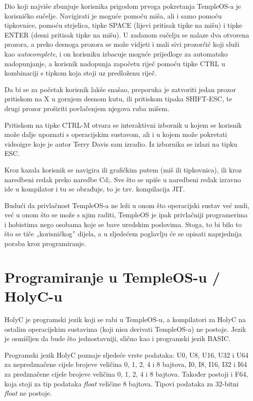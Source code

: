 \documentclass{foi}
\begin{document}
Dio koji najviše zbunjuje korisnika prigodom prvoga pokretanja TempleOS-a je korisničko sučelje. Navigirati je moguće pomoću miša, ali i samo pomoću tipkovnice, pomoću strjelica, tipke {\selectfont SPACE} (lijevi pritisak tipke na mišu) i tipke {\selectfont ENTER} (desni pritisak tipke na mišu). U zadanom sučelju se nalaze dva otvorena prozora, a preko desnoga prozora se može vidjeti i mali sivi prozorčić koji služi kao \emph{autocomplete}, i on korisniku izbacuje moguće prijedloge za automatsko nadopunjanje, a korisnik nadopunja započetu riječ pomoću tipke {\selectfont CTRL} u kombinaciji s tipkom koja stoji uz predloženu riječ.

Da bi se za početak korisnik lakše snašao, preporuka je zatvoriti jedan prozor pritiskom na {\selectfont X} u gornjem desnom kutu, ili pritiskom tipaka {\selectfont SHIFT-ESC}, te drugi prozor proširiti povlačenjem njegova ruba mišem.

Pritiskom na tipke {\selectfont CTRL-M} otvara se interaktivni izbornik u kojem se korisnik može dalje upoznati s operacijskim sustavom, ali i u kojem može pokretati videoigre koje je autor Terry Davis sam izradio. Iz izbornika se izlazi na tipku {\selectfont ESC}.

Kroz kazala korisnik se navigira ili grafičkim putem (miš ili tipkovnica), ili kroz naredbeni redak preko naredbe {\selectfont Cd;}. Sve što se upiše u naredbeni redak izravno ide u kompilator i tu se obrađuje, to je tzv. kompilacija JIT.

Budući da privlačnost TempleOS-a ne leži u onom što operacijski sustav već nudi, već u onom što se može s njim raditi, TempleOS je ipak privlačniji programerima i hobistima nego osobama koje se bave uredskim poslovima. Stoga, to bi bilo to što se tiče „korisničkog” dijela, a u sljedećem poglavlju će se opisati naprjednija poraba kroz programiranje.

\section{Programiranje u TempleOS-u / HolyC-u}

HolyC je programski jezik koji se rabi u TempleOS-u, a kompilatori za HolyC na ostalim operacijskim sustavima (koji nisu derivati TempleOS-a) ne postoje. Jezik je osmišljen da bude što jednostavniji, slično kao i programski jezik BASIC.

Programski jezik HolyC poznaje sljedeće vrste podataka: {\selectfont U0}, {\selectfont U8}, {\selectfont U16}, {\selectfont U32} i {\selectfont U64} za nepredznačene cijele brojeve veličina 0, 1, 2, 4 i 8 bajtova, {\selectfont I0}, {\selectfont I8}, {\selectfont I16}, {\selectfont I32} i {\selectfont I64} za predznačene cijele brojeve veličina 0, 1, 2, 4 i 8 bajtova. Također postoji i {\selectfont F64}, koja stoji za tip podataka \emph{float} veličine 8 bajtova. Tipovi podataka za 32-bitni \emph{float} ne postoje.\cite{HolyC}
\end{document}
